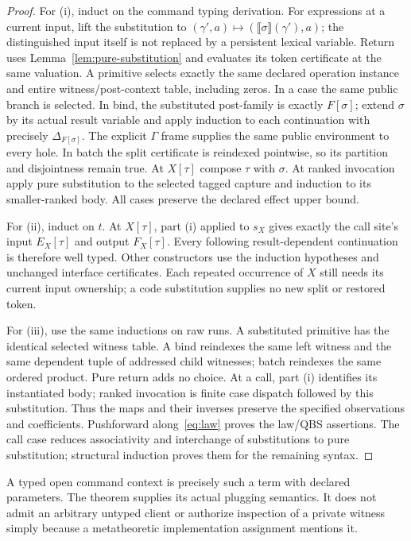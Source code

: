 \documentclass[11pt,a4paper]{article}
\theoremstyle{definition}
\newcommand{\den}[1]{\llbracket #1\rrbracket}
\begin{document}
\begin{proof}
For (i), induct on the command typing derivation. For expressions at a current input, lift the substitution to
$(\gamma',a)\mapsto(\den\sigma(\gamma'),a)$; the distinguished
input itself is not replaced by a persistent lexical variable. Return uses
Lemma~\ref{lem:pure-substitution} and evaluates its token certificate at
the same valuation. A primitive selects exactly the same declared
operation instance and entire witness/post-context table, including zeros.
In a case the same public branch is selected. In bind, the substituted
post-family is exactly $F[\sigma]$; extend $\sigma$ by its actual result
variable and apply induction to each continuation with precisely
$\Delta_{F[\sigma]}$. The explicit $\Gamma$ frame supplies the same public
environment to every hole. In batch the split certificate is reindexed
pointwise, so its partition and disjointness remain true. At $X[\tau]$
compose $\tau$ with $\sigma$. At ranked invocation apply pure substitution
to the selected tagged capture and induction to its smaller-ranked body.
All cases preserve the declared effect upper bound.

For (ii), induct on $t$. At $X[\tau]$, part (i) applied to $s_X$ gives
exactly the call site's input $E_X[\tau]$ and output $F_X[\tau]$.
Every following result-dependent continuation is therefore well typed.
Other constructors use the induction hypotheses and unchanged interface
certificates. Each repeated occurrence of $X$ still needs its current
input ownership; a code substitution supplies no new split or restored token.

For (iii), use the same inductions on raw runs. A substituted primitive
has the identical selected witness table. A bind reindexes the same left
witness and the same dependent tuple of addressed child witnesses; batch
reindexes the same ordered product. Pure return adds no choice. At a call,
part (i) identifies its instantiated body; ranked invocation is finite
case dispatch followed by this substitution. Thus the maps and their
inverses preserve the specified observations and coefficients. Pushforward
along~\eqref{eq:law} proves the law/QBS assertions. The call case reduces
associativity and interchange of substitutions to pure substitution;
structural induction proves them for the remaining syntax.
\end{proof}
A typed open command context is precisely such a term with declared
parameters. The theorem supplies its actual plugging semantics. It does
not admit an arbitrary untyped client or authorize inspection of a private
witness simply because a metatheoretic implementation assignment mentions it.
\end{document}
